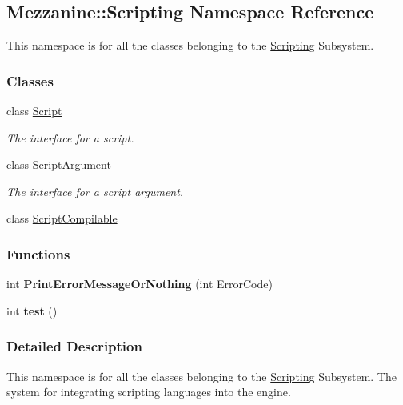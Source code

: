 \hypertarget{namespaceMezzanine_1_1Scripting}{
\subsection{Mezzanine::Scripting Namespace Reference}
\label{namespaceMezzanine_1_1Scripting}
}


This namespace is for all the classes belonging to the \hyperlink{namespaceMezzanine_1_1Scripting}{Scripting} Subsystem.  


\subsubsection*{Classes}
\begin{DoxyCompactItemize}
\item 
class \hyperlink{classMezzanine_1_1Scripting_1_1Script}{Script}
\begin{DoxyCompactList}\small\item\em The interface for a script. \item\end{DoxyCompactList}\item 
class \hyperlink{classMezzanine_1_1Scripting_1_1ScriptArgument}{ScriptArgument}
\begin{DoxyCompactList}\small\item\em The interface for a script argument. \item\end{DoxyCompactList}\item 
class \hyperlink{classMezzanine_1_1Scripting_1_1ScriptCompilable}{ScriptCompilable}
\end{DoxyCompactItemize}
\subsubsection*{Functions}
\begin{DoxyCompactItemize}
\item 
\hypertarget{namespaceMezzanine_1_1Scripting_a8002694d25b08c7055d7b320d5d4a915}{
int {\bfseries PrintErrorMessageOrNothing} (int ErrorCode)}
\label{namespaceMezzanine_1_1Scripting_a8002694d25b08c7055d7b320d5d4a915}

\item 
\hypertarget{namespaceMezzanine_1_1Scripting_a2dc33ceebeca5944ea87264348b09181}{
int {\bfseries test} ()}
\label{namespaceMezzanine_1_1Scripting_a2dc33ceebeca5944ea87264348b09181}

\end{DoxyCompactItemize}


\subsubsection{Detailed Description}
This namespace is for all the classes belonging to the \hyperlink{namespaceMezzanine_1_1Scripting}{Scripting} Subsystem. The system for integrating scripting languages into the engine. 